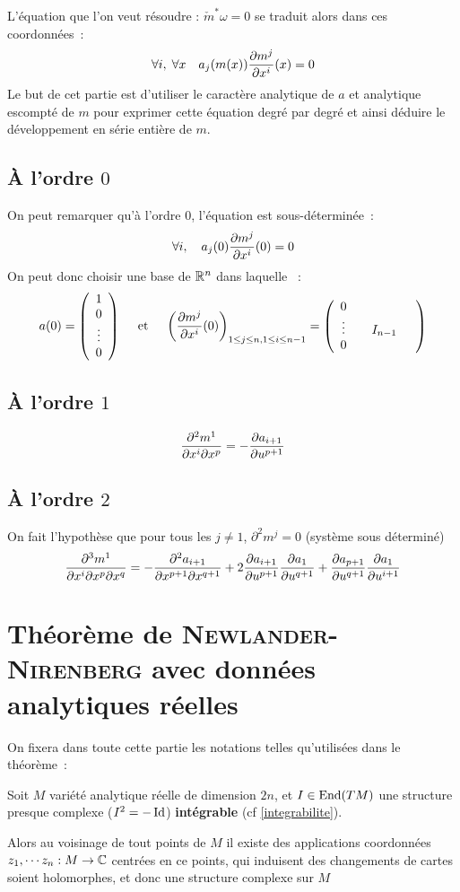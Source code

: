 \documentclass[a4paper,draft]{amsart}
\begin{document}
L'équation que l'on veut résoudre : $\check{m}^*\omega = 0$ se traduit alors dans ces coordonnées~:
\[
\forall i, \; \forall x \quad a_j(m(x))\dfrac{\partial{m^j}}{\partial{x^i}}(x) = 0
\]
Le but de cet partie est d'utiliser le caractère analytique de $a$ et analytique escompté de $m$ pour exprimer cette équation degré par degré et ainsi déduire le développement en série entière de $m$.

\subsection{À l'ordre $0$}
On peut remarquer qu'à l'ordre $0$, l'équation est sous-déterminée~:
\[
\forall i, \quad a_j(0)\dfrac{\partial{m^j}}{\partial{x^i}}(0) = 0
\]
On peut donc choisir une base de $\mathbb{R}^n$ dans laquelle ~:
\[
a(0)=
\left(\begin{array}{c}
1 \\ 
0 \\ 
\vdots \\ 
0
\end{array} \right)
\quad \text{ et } \quad
\left(\dfrac{\partial{m^j}}{\partial{x^i}}(0)\right)_{1\leq j \leq n,1\leq i\leq n-1} =
\left(\begin{array}{cccc}
0 &  &  &  \\ 
\vdots &  & I_{n-1} &  \\ 
0 &  &  & 
\end{array} \right)
\]

\subsection{À l'ordre $1$}
\[
\dfrac{\partial^2 m^1}{\partial x^i \partial x^p} = - \dfrac{\partial{a_{i+1}}}{\partial{u^{p+1}}}
\]
\subsection{À l'ordre $2$}
On fait l'hypothèse que pour tous les $j \neq 1$, $\partial^2m^j = 0$ (système sous déterminé)
\[
\dfrac{\partial^3 m^1}{\partial x^i \partial x^p \partial x^q} = -\dfrac{\partial^2 a_{i+1}}{\partial x^{p+1} \partial x^{q+1}}+2\dfrac{\partial{a_{i+1}}}{\partial{u^{p+1}}}\dfrac{\partial{a_1}}{\partial{u^{q+1}}}+\dfrac{\partial{a_{p+1}}}{\partial{u^{q+1}}}\dfrac{\partial{a_1}}{\partial{u^{i+1}}}
\]

\section{Théorème de \textsc{Newlander-Nirenberg} avec données analytiques réelles}
On fixera dans toute cette partie les notations telles qu'utilisées dans le théorème~:
\begin{thm}
Soit $M$ variété analytique réelle de dimension $2n$, et $I \in \text{End}(TM)$ une structure presque complexe ($I^2 = -\operatorname{Id}$) \textbf{intégrable} (cf \ref{integrabilite}).

Alors au voisinage de tout points de $M$ il existe des applications coordonnées $z_1,\cdots z_n: M \rightarrow \mathbb{C}$ centrées en ce points, qui induisent des changements de cartes soient holomorphes, et donc une structure complexe sur $M$
\end{thm}
\end{document}
